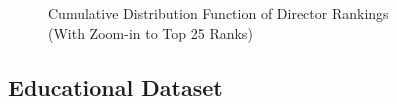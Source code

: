 \documentclass{article} %
\begin{document}
\begin{figure}[htb]
\begin{center}
\end{center}
\caption{Cumulative Distribution Function of Director Rankings \\ (With Zoom-in to Top 25 Ranks)}
\label{fig:cdf}
\end{figure}

\subsection{ Educational Dataset}
\end{document}
